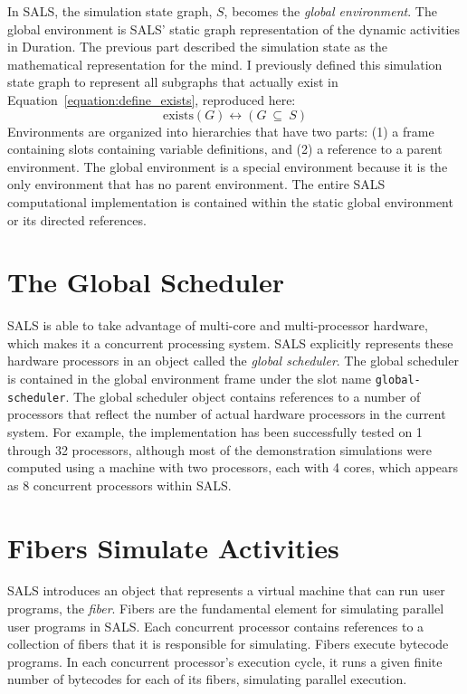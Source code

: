 In SALS, the simulation state graph, $S$, becomes the \emph{global
  environment}.  The global environment is SALS' static graph
representation of the dynamic activities in Duration.  The previous
part described the simulation state as the mathematical representation
for the mind.  I previously defined this simulation state graph to
represent all subgraphs that actually exist in
Equation\ \ref{equation:define_exists}, reproduced here:
\begin{equation*}
\text{exists}(G) \longleftrightarrow (G ~{\subseteq}~ S)
\end{equation*}
Environments are organized into hierarchies that have two parts: (1) a
frame containing slots containing variable definitions, and (2) a
reference to a parent environment.  The global environment is a
special environment because it is the only environment that has no
parent environment.  The entire SALS computational implementation is
contained within the static global environment or its directed
references.

\section{The Global Scheduler}

SALS is able to take advantage of multi-core and multi-processor
hardware, which makes it a concurrent processing system.  SALS
explicitly represents these hardware processors in an object called
the \emph{global scheduler}.  The global scheduler is contained in the
global environment frame under the slot name {\tt global-scheduler}.
The global scheduler object contains references to a number of
processors that reflect the number of actual hardware processors in
the current system.  For example, the implementation has been
successfully tested on 1 through 32 processors, although most of the
demonstration simulations were computed using a machine with two
processors, each with 4 cores, which appears as 8 concurrent
processors within SALS.

\section{Fibers Simulate Activities}

SALS introduces an object that represents a virtual machine that can
run user programs, the \emph{fiber}.  Fibers are the fundamental
element for simulating parallel user programs in SALS.  Each
concurrent processor contains references to a collection of fibers
that it is responsible for simulating.  Fibers execute bytecode
programs.  In each concurrent processor's execution cycle, it runs a
given finite number of bytecodes for each of its fibers, simulating
parallel execution.

